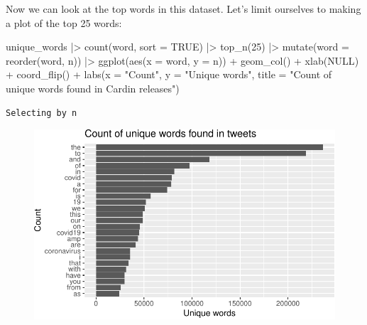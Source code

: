 \documentclass[
  letterpaper,
  DIV=11,
  numbers=noendperiod]{scrreprt}
\newenvironment{Shaded}{\begin{snugshade}}{\end{snugshade}}
\newcommand{\AttributeTok}[1]{\textcolor[rgb]{0.40,0.45,0.13}{#1}}
\newcommand{\ConstantTok}[1]{\textcolor[rgb]{0.56,0.35,0.01}{#1}}
\newcommand{\DecValTok}[1]{\textcolor[rgb]{0.68,0.00,0.00}{#1}}
\newcommand{\FunctionTok}[1]{\textcolor[rgb]{0.28,0.35,0.67}{#1}}
\newcommand{\NormalTok}[1]{\textcolor[rgb]{0.00,0.23,0.31}{#1}}
\newcommand{\SpecialCharTok}[1]{\textcolor[rgb]{0.37,0.37,0.37}{#1}}
\newcommand{\StringTok}[1]{\textcolor[rgb]{0.13,0.47,0.30}{#1}}
\begin{document}
Now we can look at the top words in this dataset. Let's limit ourselves
to making a plot of the top 25 words:

\begin{Shaded}
\begin{Highlighting}[]
\NormalTok{unique\_words }\SpecialCharTok{|\textgreater{}}
  \FunctionTok{count}\NormalTok{(word, }\AttributeTok{sort =} \ConstantTok{TRUE}\NormalTok{) }\SpecialCharTok{|\textgreater{}}
  \FunctionTok{top\_n}\NormalTok{(}\DecValTok{25}\NormalTok{) }\SpecialCharTok{|\textgreater{}}
  \FunctionTok{mutate}\NormalTok{(}\AttributeTok{word =} \FunctionTok{reorder}\NormalTok{(word, n)) }\SpecialCharTok{|\textgreater{}}
  \FunctionTok{ggplot}\NormalTok{(}\FunctionTok{aes}\NormalTok{(}\AttributeTok{x =}\NormalTok{ word, }\AttributeTok{y =}\NormalTok{ n)) }\SpecialCharTok{+}
  \FunctionTok{geom\_col}\NormalTok{() }\SpecialCharTok{+}
  \FunctionTok{xlab}\NormalTok{(}\ConstantTok{NULL}\NormalTok{) }\SpecialCharTok{+}
  \FunctionTok{coord\_flip}\NormalTok{() }\SpecialCharTok{+}
      \FunctionTok{labs}\NormalTok{(}\AttributeTok{x =} \StringTok{"Count"}\NormalTok{,}
      \AttributeTok{y =} \StringTok{"Unique words"}\NormalTok{,}
      \AttributeTok{title =} \StringTok{"Count of unique words found in Cardin releases"}\NormalTok{)}
\end{Highlighting}
\end{Shaded}

\begin{verbatim}
Selecting by n
\end{verbatim}

\begin{figure}[H]

{\centering \includegraphics{./textanalysis_files/figure-pdf/unnamed-chunk-7-1.pdf}

}

\end{figure}
\end{document}
